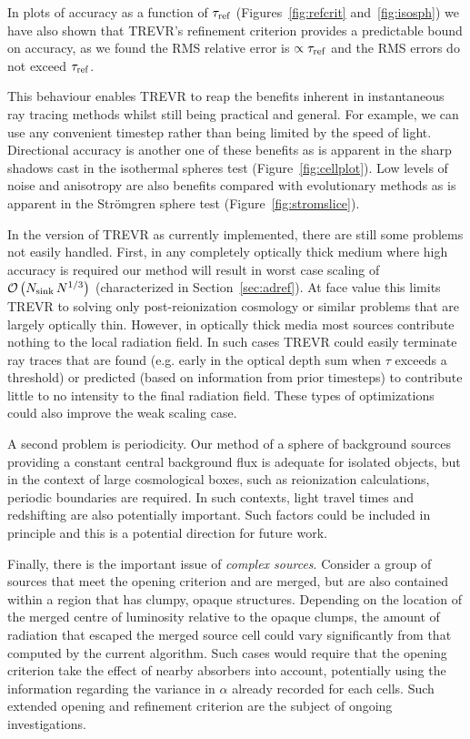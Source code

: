 \documentclass[fleq,usenatbib]{mnras}
\newcommand{\acro}{TREVR}
\newcommand{\bigO}[1]{\mathcal{O}\left(#1\right)}
\newcommand{\NK}{N_{\rm sink}}
\newcommand{\tr}{\tau_{\rm ref}}
\newcommand{\strom}{Str\"omgren}
\begin{document}
{In plots of accuracy as a function of $\tr$ (Figures~\ref{fig:refcrit} 
and~\ref{fig:isosph}) we have also shown that \acro{}'s refinement criterion 
provides a predictable bound on accuracy, as we found the 
RMS relative error is $\propto \tr$ and the RMS 
errors do not exceed $\tr$.  

This behaviour enables \acro{} to reap the benefits inherent in instantaneous 
ray tracing methods whilst still being practical and general.  For example,
we can use any convenient timestep rather than being limited by the speed of 
light. Directional accuracy is another one of these benefits as is apparent in 
the sharp shadows cast in the isothermal spheres test 
(Figure~\ref{fig:cellplot}). Low levels of noise and anisotropy are also 
benefits compared with evolutionary methods as is apparent in the \strom{} 
sphere test (Figure~\ref{fig:stromslice}).

In the version of \acro{} as currently implemented, there are still some 
problems not easily handled. First, in any completely optically thick medium 
where high accuracy is required our method will result in worst case scaling 
of $\bigO{\NK\,N^{1/3}}$ (characterized in Section~\ref{sec:adref}). At face 
value this limits \acro{} to solving only post-reionization cosmology or 
similar problems that are largely optically thin. However, in optically thick 
media most sources contribute nothing to the local radiation field. In such 
cases \acro{} could easily terminate ray traces that are found (e.g. early in 
the optical depth sum when $\tau$ exceeds a threshold) or predicted (based on 
information from prior timesteps) to contribute little to no intensity to the 
final radiation field. These types of optimizations could also improve the 
weak scaling case.

A second problem is periodicity. Our method of a sphere of background sources 
providing a constant central background flux is adequate for isolated objects, 
but in the context of large cosmological boxes, such as reionization 
calculations, periodic boundaries are required. In such contexts, light travel 
times and redshifting are also potentially important. Such factors could be 
included in principle and this is a potential direction for future work.

Finally, there is the important issue of \textit{complex sources}. 
Consider a group of sources that meet the opening criterion and are merged, 
but are also contained within a region that has clumpy, opaque structures. 
Depending on the location of the merged centre of luminosity relative to the 
opaque clumps, the amount of radiation that escaped the merged source cell 
could vary significantly from that computed by the current algorithm.
Such cases would require that the opening criterion take the effect of
nearby absorbers into account, potentially using the information regarding
the variance in $\alpha$ already recorded for each cells. Such extended opening
and refinement criterion are the subject of ongoing investigations.

}
\end{document}
